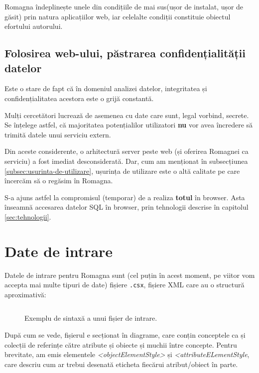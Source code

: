 \documentclass[12pt, a4paper, twoside, romanian]{teza-upb}
\begin{document}
      Romagna îndeplinește unele din condițiile de mai sus(ușor de instalat, ușor de găsit) prin natura aplicațiilor web, iar celelalte condiții constituie obiectul efortului autorului.

    \subsection{Folosirea web-ului, păstrarea confidențialității datelor}
    \label{subsec:confidentiality}

      Este o stare de fapt că în domeniul analizei datelor, integritatea și confidențialitatea acestora este o grijă constantă.

      Mulți cercetători lucrează de asemenea cu date care sunt, legal vorbind, secrete. Se înțelege astfel, că majoritatea potențialilor utilizatori \textbf{nu} vor avea încredere să trimită datele unui serviciu extern.

      Din aceste considerente, o arhitectură server peste web (și oferirea Romagnei ca serviciu) a fost imediat desconsiderată. Dar, cum am menționat în subsecțiunea \ref{subsec:usurinta-de-utilizare}, ușurința de utilizare este o altă calitate pe care încercăm să o regăsim în Romagna. 
      
      S-a ajuns astfel la compromisul (temporar) de a realiza \textbf{totul} în browser. Asta înseamnă accesarea datelor SQL în browser, prin tehnologii descrise în capitolul \ref{sec:tehnologii}.

  \section{Date de intrare}

    Datele de intrare pentru Romagna sunt (cel puțin în acest moment, pe viitor vom accepta mai multe tipuri de date) fișiere \verb=.csx=, fișiere XML care au o structură aproximativă:

    \begin{figure}[h!]
    \inputminted[fontsize=\footnotesize]{xml}{context.csx}
    \caption{Exemplu de sintaxă a unui fișier de intrare.}
    \end{figure}

    După cum se vede, fișierul e secționat în diagrame, care conțin conceptele ca și colecții de referințe către atribute și obiecte și muchii între concepte. Pentru brevitate, am emis elementele \textit{<objectElementStyle>} și \textit{<attributeELementStyle}, care descriu cum ar trebui desenată eticheta fiecărui atribut/obiect în parte.
\end{document}
